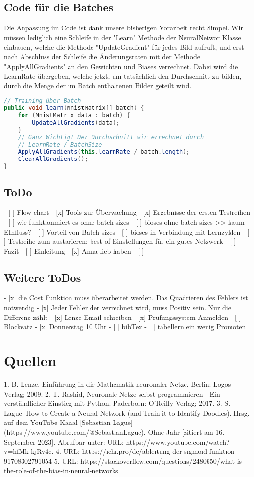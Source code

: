 \documentclass[12pt]{article}
\begin{document}
\subsection{ Code für die Batches}
Die Anpassung im Code ist dank unsere bisherigen Vorarbeit recht Simpel.
Wir müssen lediglich eine Schleife in der "Learn" Methode der NeuralNetwor Klasse einbauen, welche die Methode "UpdateGradient" für jedes Bild aufruft, und erst nach Abschluss der Schleife die Änderungsraten mit der Methode "ApplyAllGradients" an den Gewichten und Biases verrechnet. Dabei wird die LearnRate übergeben, welche jetzt, um tatsächlich den Durchschnitt zu bilden, durch die Menge der im Batch enthaltenen Bilder geteilt wird.\begin{lstlisting}[language=Java]
// Training über Batch
public void learn(MnistMatrix[] batch) {
    for (MnistMatrix data : batch) {
        UpdateAllGradients(data);
    }
    // Ganz Wichtig! Der Durchschnitt wir errechnet durch
    // LearnRate / BatchSize
    ApplyAllGradients(this.learnRate / batch.length);
    ClearAllGradients();
}
\end{lstlisting}\subsection{ ToDo}- [ ] Flow chart
- [x] Tools zur Überwachung
- [x] Ergebnisse der ersten Testreihen
- [ ] wie funktionmiert es ohne batch sizes
- [ ] bioses ohne batch sizes >> kaum EInfluss?
- [ ] Vorteil von Batch sizes
- [ ] bioses in Verbindung mit Lernzyklen
- [ ] Testreihe zum austarieren: best of Einstellungen für ein gutes Netzwerk
- [ ] Fazit
- [ ] Einleitung
- [x] Anna lieb haben
- [ ] \subsection{ Weitere ToDos}- [x] die Cost Funktion muss überarbeitet werden. Das Quadrieren des Fehlers ist notwendig
  - [x] Jeder Fehler der verrechnet wird, muss Positiv sein. Nur die Differenz zählt
- [x] Lenze Email schreiben
- [x] Prüfungssystem Anmelden
- [ ] Blocksatz
- [x] Donnerstag 10 Uhr
- [ ] bibTex
- [ ] tabellern ein wenig Promoten\section{ Quellen}
1. B. Lenze, Einführung in die Mathematik neuronaler Netze. Berlin: Logos Verlag; 2009.
2. T. Rashid, Neuronale Netze selbst programmieren - Ein verständlicher Einstieg mit Python. Paderborn: O’Reilly Verlag; 2017.
3. S. Lague, How to Create a Neural Network (and Train it to Identify Doodles). Hrsg. auf dem YouTube Kanal [Sebastian Lague](https://www.youtube.com/@SebastianLague). Ohne Jahr [zitiert am 16. September 2023]. Abrufbar unter: URL: https://www.youtube.com/watch?v=hfMk-kjRv4c.
4. URL: https://ichi.pro/de/ableitung-der-sigmoid-funktion-91708302791054
5. URL: https://stackoverflow.com/questions/2480650/what-is-the-role-of-the-bias-in-neural-networks
\cleardoublepage
{}
\listoffigures
\end{document}
